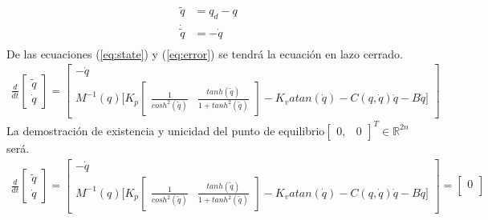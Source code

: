 \documentclass[12pt]{article}
\begin{document}
\begin{enumerate}
\begin{equation}
\begin{split}
            \tilde{q}&=q_d-q\\
            \dot{\tilde{q}}&=-\dot{q}\\
        \end{split}
        \label{eq:error}
    \end{equation}
    De las ecuaciones (\ref{eq:state}) y (\ref{eq:error}) se tendrá la ecuación en lazo cerrado.
    \begin{equation}
        \begin{split}
            \frac{d}{dt}\begin{bmatrix}
                \tilde{q}\\
                \dot{q}
            \end{bmatrix}=\begin{bmatrix}
                -\dot{q}\\
                M^{-1}(q)\lbrack K_p
            \begin{bmatrix}
                \frac{1}{cosh^2(\tilde{q})}&\frac{tanh(\tilde{q})}{1+tanh^2(\tilde{q})}
            \end{bmatrix}
            -K_vatan(\dot{q})-C(q,\dot{q})\dot{q}-B\dot{q}\rbrack
            \end{bmatrix}
        \end{split}
        \label{eq:closed_matrix}
    \end{equation}
    La demostración de existencia y unicidad del punto de equilibrio$\begin{bmatrix}
        0,&0
    \end{bmatrix}^T \in  \mathbb{R}^{2n} $ será.
    \begin{equation}
        \begin{split}
            \frac{d}{dt}\begin{bmatrix}
                \tilde{q}\\
                \dot{q}
            \end{bmatrix}=\begin{bmatrix}
                -\dot{q}\\
                M^{-1}(q)\lbrack K_p
            \begin{bmatrix}
                \frac{1}{cosh^2(\tilde{q})}&\frac{tanh(\tilde{q})}{1+tanh^2(\tilde{q})}
            \end{bmatrix}
            -K_vatan(\dot{q})-C(q,\dot{q})\dot{q}-B\dot{q}\rbrack
            \end{bmatrix}=\begin{bmatrix}
                0\\

\end{bmatrix}
\end{split}
\end{equation}
\end{enumerate}
\end{document}
